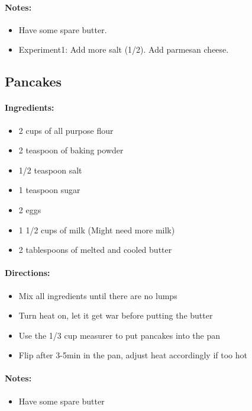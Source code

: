 \documentclass{article}
\begin{document}
\paragraph{Notes:}
\begin{itemize}
    \item Have some spare butter.
    \item Experiment1: Add more salt (1/2). Add parmesan cheese.
\end{itemize}

\subsection{Pancakes}

\paragraph{Ingredients:}
\begin{itemize}
    \item 2 cups of all purpose flour
    \item 2 teaspoon of baking powder
    \item 1/2 teaspoon salt
    \item 1 teaspoon sugar
    \item 2 eggs
    \item 1 1/2 cups of milk (Might need more milk)
    \item 2 tablespoons of melted and cooled butter
\end{itemize}

\paragraph{Directions:}
\begin{itemize}
    \item Mix all ingredients until there are no lumps
    \item Turn heat on, let it get war before putting the butter
    \item Use the 1/3 cup measurer to put pancakes into the pan
    \item Flip after 3-5min in the pan, adjust heat accordingly if too hot
\end{itemize}

\paragraph{Notes:}
\begin{itemize}
    \item Have some spare butter
\end{itemize}
\end{document}
